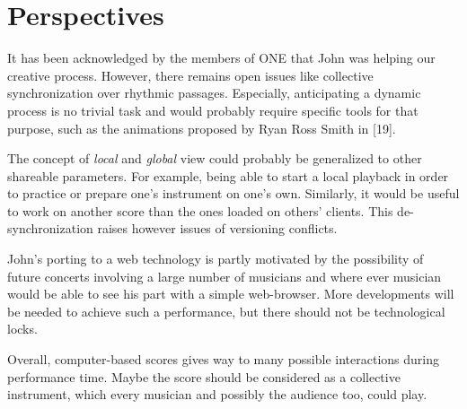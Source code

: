 \section{Perspectives}

It has been acknowledged by the members of ONE that John was helping our creative process. However, there remains open issues like collective synchronization over rhythmic passages. Especially, anticipating a dynamic process is no trivial task and would probably require specific tools for that purpose, such as the animations proposed by Ryan Ross Smith in [19].

The concept of \textit{local} and \textit{global} view could probably be generalized to other shareable parameters. For example, being able to start a local playback in order to practice or prepare one's instrument on one's own. Similarly, it would be useful to work on another score than the ones loaded on others' clients. This de-synchronization raises however issues of versioning conflicts.

John's porting to a web technology is partly motivated by the possibility of future concerts involving a large number of musicians and where ever musician would be able to see his part with a simple web-browser. More developments will be needed to achieve such a performance, but there should not be technological locks.

Overall, computer-based scores gives way to many possible interactions during performance time. Maybe the score should be considered as a collective instrument,  which every musician and possibly the audience too, could play.
